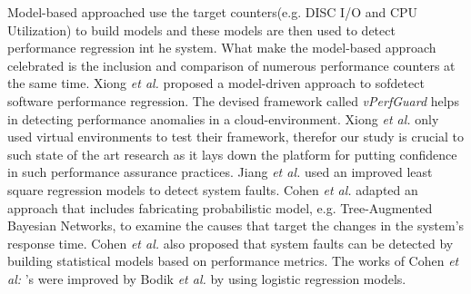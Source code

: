 Model-based approached use the target counters(e.g. DISC I/O and CPU Utilization) to build models and these models are then used to detect performance regression int he system. What make the model-based approach celebrated is the inclusion and comparison of numerous performance counters at the same time. 
Xiong \textit{et al.} \cite{xiong2013vperfguard} proposed a model-driven approach to sofdetect software performance regression. The devised framework called \textit{vPerfGuard} helps in detecting performance anomalies in a cloud-environment. Xiong \textit{et al.} \cite{xiong2013vperfguard} only used virtual environments to test their framework, therefor our study is crucial to such state of the art research as it lays down the platform for putting confidence in such performance assurance practices.
Jiang \textit{et al. }\cite{jiang2011system} used an improved least square regression models to detect system faults.
Cohen \textit{et al. }\cite{cohen2004correlating} adapted an approach that includes fabricating probabilistic model, e.g. Tree-Augmented Bayesian Networks, to examine the causes that target the changes in the system's response time. Cohen \textit{et al. }\cite{Cohen:2005:CIC:1095810.1095821} also proposed that system faults can be detected by building statistical models based on performance metrics. The works of Cohen \textit{et al: }'s \cite{cohen2004correlating} \cite{Cohen:2005:CIC:1095810.1095821} were improved by Bodik \textit{et al.} \cite{bodik2008hilighter} by using logistic regression models.



